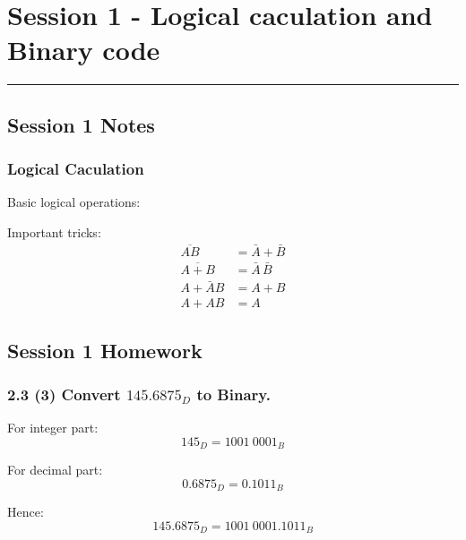 \section{Session 1 - Logical caculation and Binary code}
\vspace{-15pt}\noindent\rule{\textwidth}{0.1pt}\vspace{-10pt}
    \subsection*{Session 1 Notes}
    \subsubsection*{Logical Caculation}

    Basic logical operations:
    \small{}

    Important tricks:
    \begin{align}
        \overline{AB}   &= \bar{A} + \bar{B}\\
        \overline{A+B}  &= \bar{A} \,\bar{B}\\
        A + \bar{A}B    &= A + B\\
        A + AB          &= A
    \end{align}

    \subsection*{Session 1 Homework}
    \subsubsection{2.3 (3) \textnormal{Convert $145.6875_D$ to Binary}.}
    {\color{hwSolution}
        For integer part: \[145_D = 1001~0001_B\]

        For decimal part: \[0.6875_D = 0.1011_B\]

        Hence:            \[145.6875_D = 1001~0001.1011_B\]
    }
